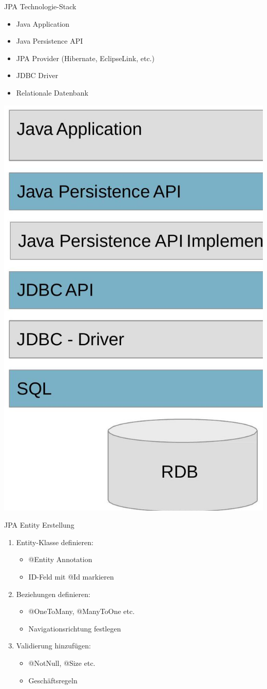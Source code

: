 \begin{concept}{JPA Technologie-Stack}
\begin{itemize}
    \item Java Application
    \item Java Persistence API
    \item JPA Provider (Hibernate, EclipseLink, etc.)
    \item JDBC Driver
    \item Relationale Datenbank
\end{itemize}
\includegraphics[width=0.5\linewidth]{images/2025_01_02_5ba1dc702e9f94ba8e06g-29.jpg}
\end{concept}

\begin{KR}{JPA Entity Erstellung}
\begin{enumerate}
    \item Entity-Klasse definieren:
    \begin{itemize}
        \item @Entity Annotation
        \item ID-Feld mit @Id markieren
    \end{itemize}
    \item Beziehungen definieren:
    \begin{itemize}
        \item @OneToMany, @ManyToOne etc.
        \item Navigationsrichtung festlegen
    \end{itemize}
    \item Validierung hinzufügen:
    \begin{itemize}
        \item @NotNull, @Size etc.
        \item Geschäftsregeln
    \end{itemize}
\end{enumerate}
\end{KR}

